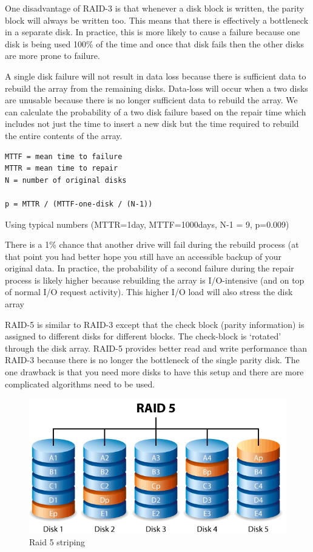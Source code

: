 One disadvantage of RAID-3 is that whenever a disk block is written, the parity block will always be written too.
This means that there is effectively a bottleneck in a separate disk.
In practice, this is more likely to cause a failure because one disk is being used 100\% of the time and once that disk fails then the other disks are more prone to failure.

A single disk failure will not result in data loss because there is sufficient data to rebuild the array from the remaining disks.
Data-loss will occur when a two disks are unusable because there is no longer sufficient data to rebuild the array.
We can calculate the probability of a two disk failure based on the repair time which includes not just the time to insert a new disk but the time required to rebuild the entire contents of the array.

\begin{verbatim}
MTTF = mean time to failure
MTTR = mean time to repair
N = number of original disks

p = MTTR / (MTTF-one-disk / (N-1))
\end{verbatim}

Using typical numbers (MTTR=1day, MTTF=1000days, N-1 = 9, p=0.009)

There is a 1\% chance that another drive will fail during the rebuild process (at that point you had better hope you still have an accessible backup of your original data.
In practice, the probability of a second failure during the repair process is likely higher because rebuilding the array is I/O-intensive (and on top of normal I/O request activity).
This higher I/O load will also stress the disk array

RAID-5 is similar to RAID-3 except that the check block (parity information) is assigned to different disks for different blocks.
The check-block is `rotated' through the disk array.
RAID-5 provides better read and write performance than RAID-3 because there is no longer the bottleneck of the single parity disk.
The one drawback is that you need more disks to have this setup and there are more complicated algorithms need to be used.

\begin{figure}[htbp]
\centering
\includegraphics[width=.8\textwidth]{filesystems/images/raid_5.png}
\caption{Raid 5 striping}
\end{figure}

